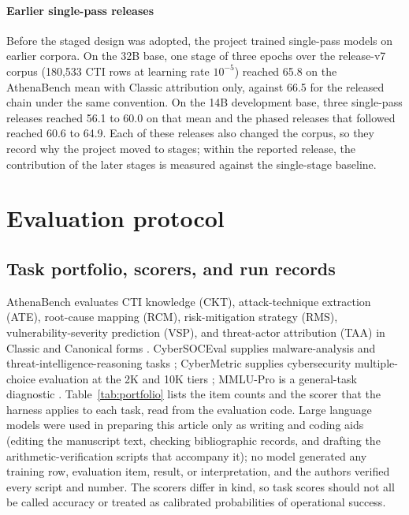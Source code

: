\documentclass[a4paper,fleqn]{cas-dc}
\begin{document}
\paragraph{Earlier single-pass releases}
Before the staged design was adopted, the project trained single-pass models on earlier corpora. On the 32B base, one stage of three epochs over the release-v7 corpus (180,533 CTI rows at learning rate $10^{-5}$) reached 65.8 on the AthenaBench mean with Classic attribution only, against 66.5 for the released chain under the same convention. On the 14B development base, three single-pass releases reached 56.1 to 60.0 on that mean and the phased releases that followed reached 60.6 to 64.9. Each of these releases also changed the corpus, so they record why the project moved to stages; within the reported release, the contribution of the later stages is measured against the single-stage baseline.


\section{Evaluation protocol}\label{sec:evaluation}
\subsection{Task portfolio, scorers, and run records}
AthenaBench evaluates CTI knowledge (CKT), attack-technique extraction (ATE), root-cause mapping (RCM), risk-mitigation strategy (RMS), vulnerability-severity prediction (VSP), and threat-actor attribution (TAA) in Classic and Canonical forms \citep{alam2025athenabench}. CyberSOCEval supplies malware-analysis and threat-intelligence-reasoning tasks \citep{deason2025cybersoceval}; CyberMetric supplies cybersecurity multiple-choice evaluation at the 2K and 10K tiers \citep{tihanyi2024cybermetric}; MMLU-Pro is a general-task diagnostic \citep{wang2024mmlupro}. Table~\ref{tab:portfolio} lists the item counts and the scorer that the harness applies to each task, read from the evaluation code. Large language models were used in preparing this article only as writing and coding aids (editing the manuscript text, checking bibliographic records, and drafting the arithmetic-verification scripts that accompany it); no model generated any training row, evaluation item, result, or interpretation, and the authors verified every script and number. The scorers differ in kind, so task scores should not all be called accuracy or treated as calibrated probabilities of operational success.
\end{document}
